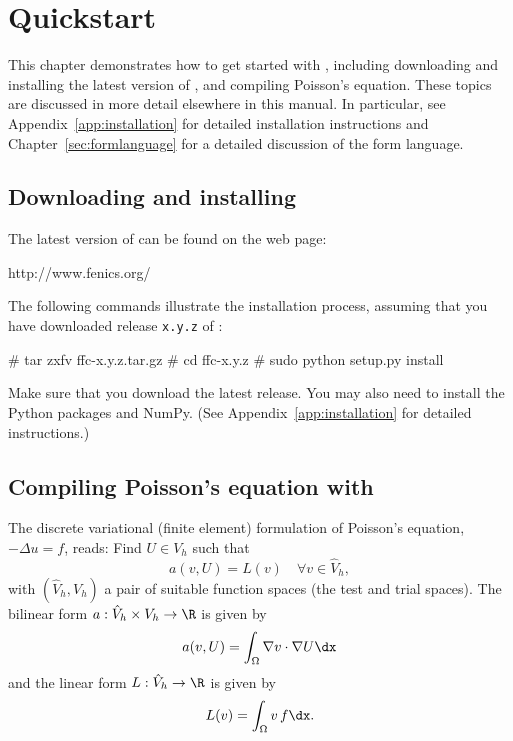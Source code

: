 \chapter{Quickstart}

This chapter demonstrates how to get started with \ffc{}, including
downloading and installing the latest version of \ffc{}, and compiling
Poisson's equation. These topics are discussed in more detail
elsewhere in this manual. In particular, see
Appendix~\ref{app:installation} for detailed installation instructions
and Chapter~\ref{sec:formlanguage} for a detailed discussion of the
form language.

\section{Downloading and installing \ffc{}}

The latest version of \ffc{} can be found on the \fenics{} web page:
\begin{code}
http://www.fenics.org/
\end{code}
The following commands illustrate the installation process, assuming
that you have downloaded release \texttt{x.y.z} of \ffc{}:
\begin{code}
# tar zxfv ffc-x.y.z.tar.gz
# cd ffc-x.y.z
# sudo python setup.py install
\end{code}
Make sure that you download the latest release.
You may also need to install the Python packages \fiat{} and
NumPy. (See Appendix~\ref{app:installation} for detailed instructions.)

\section{Compiling Poisson's equation with \ffc{}}

The discrete variational (finite element) formulation of Poisson's
equation, $-\Delta u = f$, reads: Find $U \in V_h$ such that
\begin{equation} \label{eq:varform}
  a(v, U) = L(v) \quad \forall v\in \hat{V}_h, 
\end{equation}
with $(\hat{V}_h, V_h)$ a pair of suitable function spaces (the test and
trial spaces). The bilinear form $a : \hat{V}_h \times V_h \rightarrow
\R$ is given by
\begin{equation}
  a(v, U) = \int_{\Omega} \nabla v \cdot \nabla U \dx
\end{equation}
and the linear form $L : \hat{V}_h \rightarrow \R$ is given by
\begin{equation}
  L(v) = \int_{\Omega} v \, f \dx.
\end{equation}

